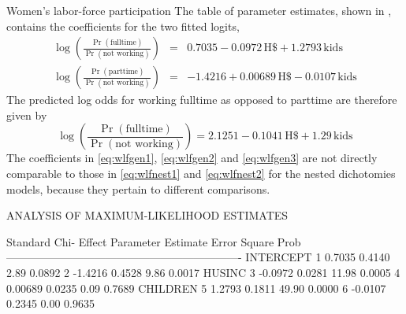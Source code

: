 \begin{Example}[wlfpart2]{Women's labor-force participation}
The table of parameter estimates, shown in , contains the coefficients
for the two fitted logits,
\begin{eqnarray}
  \log \left( \frac{ \Pr ( \mbox{fulltime} ) }
  { \Pr ( \mbox{not working} ) } \right)  & = &
  0.7035 - 0.0972 \,  \mbox{H\$} + 1.2793 \,  \mbox{kids} \label{eq:wlfgen1}\\
%
  \log \left( \frac{ \Pr ( \mbox{parttime} ) }
  { \Pr ( \mbox{not working} ) } \right) & = &
  -1.4216 + 0.00689 \,  \mbox{H\$} - 0.0107 \,  \mbox{kids} \label{eq:wlfgen2}
\end{eqnarray}
The predicted log odds for working fulltime as opposed to parttime
are therefore given by
\begin{equation}\label{eq:wlfgen3}
  \log \left( \frac{ \Pr ( \mbox{fulltime} ) }
  { \Pr ( \mbox{not working} ) } \right)  =
  2.1251 - 0.1041 \,  \mbox{H\$} + 1.29 \,  \mbox{kids}
\end{equation}
The coefficients in \eqref{eq:wlfgen1}, \eqref{eq:wlfgen2} and \eqref{eq:wlfgen3}
are not directly comparable to those in
\eqref{eq:wlfnest1} and \eqref{eq:wlfnest2} for the nested
dichotomies models, because they pertain to different comparisons.
\begin{Output}[htb]
\caption{Women's labor-force data, generalized logit model parameter estimates}\label{out:wlfpart3.2}
\small
\begin{output}
              ANALYSIS OF MAXIMUM-LIKELIHOOD ESTIMATES

                                         Standard    Chi-
  Effect            Parameter  Estimate    Error    Square   Prob
  ----------------------------------------------------------------
  INTERCEPT                 1    0.7035    0.4140     2.89  0.0892
                            2   -1.4216    0.4528     9.86  0.0017
  HUSINC                    3   -0.0972    0.0281    11.98  0.0005
                            4   0.00689    0.0235     0.09  0.7689
  CHILDREN                  5    1.2793    0.1811    49.90  0.0000
                            6   -0.0107    0.2345     0.00  0.9635
\end{output}
\end{Output}


\end{Example}
